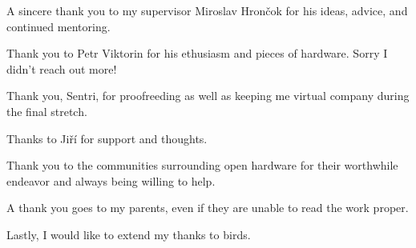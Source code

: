 A sincere thank you to my supervisor Miroslav Hrončok for his ideas, advice, and continued mentoring.

Thank you to Petr Viktorin for his ethusiasm and pieces of hardware.  Sorry I didn't reach out more!

Thank you, Sentri, for proofreeding as well as keeping me virtual company during the final stretch.

Thanks to Jiří for support and thoughts.

Thank you to the communities surrounding open hardware for their worthwhile endeavor and always being willing to help.

A thank you goes to my parents, even if they are unable to read the work proper.

Lastly, I would like to extend my thanks to birds.

